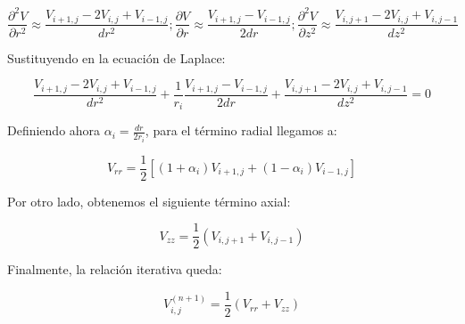 \documentclass[12pt]{article}
\begin{document}
\begin{equation}
\frac{\partial^2 V}{\partial r^2}
\approx
\frac{V_{i+1,j} - 2V_{i,j} + V_{i-1,j}}{dr^2}; \frac{\partial V}{\partial r}
\approx
\frac{V_{i+1,j} - V_{i-1,j}}{2dr};\frac{\partial^2 V}{\partial z^2}
\approx
\frac{V_{i,j+1} - 2V_{i,j} + V_{i,j-1}}{dz^2}
\end{equation}

Sustituyendo en la ecuación de Laplace:

\begin{equation}
\frac{V_{i+1,j} - 2V_{i,j} + V_{i-1,j}}{dr^2}
+
\frac{1}{r_i}\frac{V_{i+1,j} - V_{i-1,j}}{2dr}
+
\frac{V_{i,j+1} - 2V_{i,j} + V_{i,j-1}}{dz^2}
= 0
\end{equation}

Definiendo ahora $\alpha_i = \frac{dr}{2r_i}$, para el término radial llegamos a:

\begin{equation}
V_{rr} =
\frac{1}{2}\left[
(1+\alpha_i)V_{i+1,j} + (1-\alpha_i)V_{i-1,j}
\right]
\end{equation}

Por otro lado, obtenemos el siguiente término axial:

\begin{equation}
V_{zz} =
\frac{1}{2}\left(V_{i,j+1} + V_{i,j-1}\right)
\end{equation}

Finalmente, la relación iterativa queda:

\begin{equation}
V_{i,j}^{(n+1)} =
\frac{1}{2}\left(V_{rr} + V_{zz}\right)
\end{equation}
\end{document}
